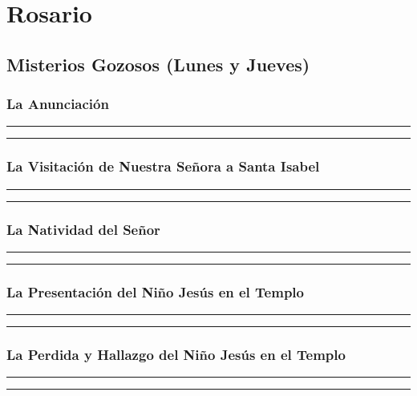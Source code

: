 \documentclass[11pt,a4paper]{report}
\begin{document}
    \section*{Rosario}

    
    
    \subsection*{Misterios Gozosos (Lunes y Jueves)}

    \subsubsection*{La Anunciación}
    
    
    \rule{\textwidth}{0.5pt}
    
    \rule{\textwidth}{0.5pt}
    

    \subsubsection*{La Visitación de Nuestra Señora a Santa Isabel}
    
    
    \rule{\textwidth}{0.5pt}
    
    \rule{\textwidth}{0.5pt}
    

    \subsubsection*{La Natividad del Señor}
    
    
    \rule{\textwidth}{0.5pt}
    
    \rule{\textwidth}{0.5pt}
    

    \subsubsection*{La Presentación del Niño Jesús en el Templo}
    
    
    \rule{\textwidth}{0.5pt}
    
    \rule{\textwidth}{0.5pt}
    

    \subsubsection*{La Perdida y Hallazgo del Niño Jesús en el Templo}
    
    
    \rule{\textwidth}{0.5pt}
    
    \rule{\textwidth}{0.5pt}
    
\end{document}
